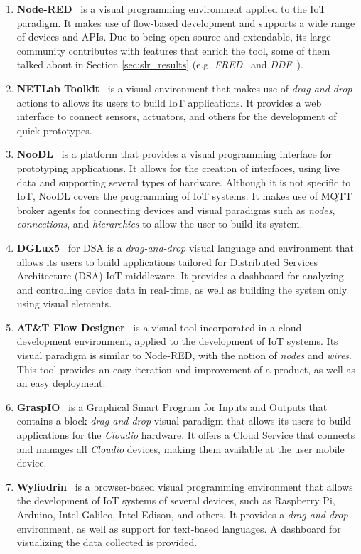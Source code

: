 \begin{enumerate}
    \item \textbf{Node-RED}~\cite{node_red} is a visual programming environment applied to the IoT paradigm. It makes use of flow-based development and supports a wide range of devices and APIs. Due to being open-source and extendable, its large community contributes with features that enrich the tool, some of them talked about in Section \ref{sec:slr_results} (e.g. \textit{FRED}~\cite{fred} and \textit{DDF}~\cite{ddf}).
    \item \textbf{NETLab Toolkit}~\cite{netlabtoolkit} is a visual environment that makes use of \textit{drag-and-drop} actions to allows its users to build IoT applications. It provides a web interface to connect sensors, actuators, and others for the development of quick prototypes.
    \item \textbf{NooDL}~\cite{noodl} is a platform that provides a visual programming interface for prototyping applications. It allows for the creation of interfaces, using live data and supporting several types of hardware. Although it is not specific to IoT, NooDL covers the programming of IoT systems. It makes use of MQTT broker agents for connecting devices and visual paradigms such as \textit{nodes}, \textit{connections}, and \textit{hierarchies} to allow the user to build its system.
    \item \textbf{DGLux5}~\cite{dglux5} for DSA is a \textit{drag-and-drop} visual language and environment that allows its users to build applications tailored for Distributed Services Architecture (DSA) IoT middleware. It provides a dashboard for analyzing and controlling device data in real-time, as well as building the system only using visual elements.
    \item \textbf{AT\&T Flow Designer}~\cite{attflowdesigner} is a visual tool incorporated in a cloud development environment, applied to the development of IoT systems. Its visual paradigm is similar to Node-RED, with the notion of \textit{nodes} and \textit{wires}. This tool provides an easy iteration and improvement of a product, as well as an easy deployment.
    \item \textbf{GraspIO}~\cite{graspio} is a Graphical Smart Program for Inputs and Outputs that contains a block \textit{drag-and-drop} visual paradigm that allows its users to build applications for the \textit{Cloudio} hardware. It offers a Cloud Service that connects and manages all \textit{Cloudio} devices, making them available at the user mobile device.
    \item \textbf{Wyliodrin}~\cite{wyliodrin} is a browser-based visual programming environment that allows the development of IoT systems of several devices, such as Raspberry Pi, Arduino, Intel Galileo, Intel Edison, and others. It provides a \textit{drag-and-drop} environment, as well as support for text-based languages. A dashboard for visualizing the data collected is provided.

\end{enumerate}

